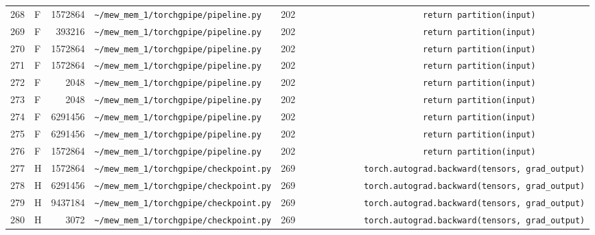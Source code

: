 \documentclass{article}
\begin{document}
\begin{longtable}{r l r p{6.5cm} r p{7.0cm}}
268 & F & 1572864 & \lstinline|~/mew_mem_1/torchgpipe/pipeline.py| & 202 & \lstinline|                        return partition(input)| \\
269 & F & 393216 & \lstinline|~/mew_mem_1/torchgpipe/pipeline.py| & 202 & \lstinline|                        return partition(input)| \\
270 & F & 1572864 & \lstinline|~/mew_mem_1/torchgpipe/pipeline.py| & 202 & \lstinline|                        return partition(input)| \\
271 & F & 1572864 & \lstinline|~/mew_mem_1/torchgpipe/pipeline.py| & 202 & \lstinline|                        return partition(input)| \\
272 & F & 2048 & \lstinline|~/mew_mem_1/torchgpipe/pipeline.py| & 202 & \lstinline|                        return partition(input)| \\
273 & F & 2048 & \lstinline|~/mew_mem_1/torchgpipe/pipeline.py| & 202 & \lstinline|                        return partition(input)| \\
274 & F & 6291456 & \lstinline|~/mew_mem_1/torchgpipe/pipeline.py| & 202 & \lstinline|                        return partition(input)| \\
275 & F & 6291456 & \lstinline|~/mew_mem_1/torchgpipe/pipeline.py| & 202 & \lstinline|                        return partition(input)| \\
276 & F & 1572864 & \lstinline|~/mew_mem_1/torchgpipe/pipeline.py| & 202 & \lstinline|                        return partition(input)| \\
277 & H & 1572864 & \lstinline|~/mew_mem_1/torchgpipe/checkpoint.py| & 269 & \lstinline|            torch.autograd.backward(tensors, grad_output)| \\
278 & H & 6291456 & \lstinline|~/mew_mem_1/torchgpipe/checkpoint.py| & 269 & \lstinline|            torch.autograd.backward(tensors, grad_output)| \\
279 & H & 9437184 & \lstinline|~/mew_mem_1/torchgpipe/checkpoint.py| & 269 & \lstinline|            torch.autograd.backward(tensors, grad_output)| \\
280 & H & 3072 & \lstinline|~/mew_mem_1/torchgpipe/checkpoint.py| & 269 & \lstinline|            torch.autograd.backward(tensors, grad_output)| \\
\end{longtable}
\end{document}
